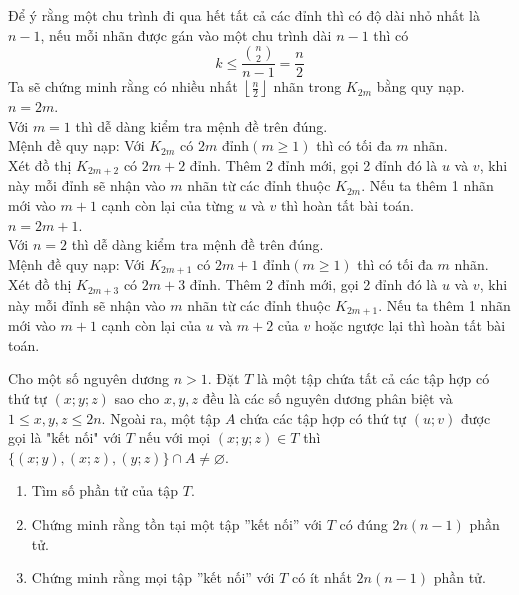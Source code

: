 \documentclass[11pt]{scrartcl}
\begin{document}
\begin{itemize}[label=, leftmargin=0em, itemsep=0.5em]
\begin{sol}
        Để ý rằng một chu trình  đi qua hết tất cả các đỉnh thì có độ dài nhỏ nhất là $n - 1$, nếu mỗi nhãn được gán vào một chu trình dài $n-1$ thì có 
        $$
        k \leq \frac{\displaystyle \binom{n}{2}}{n-1} = \frac{n}{2}
        $$
        Ta sẽ chứng minh rằng có nhiều nhất $\left\lfloor\frac{n}{2}\right\rfloor$ nhãn trong $K_{2m}$ bằng quy nạp.\\
         $n = 2m$.\\
        Với $m = 1$ thì dễ dàng kiểm tra mệnh đề trên đúng.\\
        Mệnh đề quy nạp: Với $K_{2m}$ có $2m$ đỉnh$(m \geq 1)$ thì có tối đa $m$ nhãn.\\
        Xét đồ thị $K_{2m+2}$ có $2m + 2$ đỉnh. Thêm 2 đỉnh mới, gọi 2 đỉnh đó là $u$ và $v$, khi này mỗi đỉnh sẽ nhận vào $m$ nhãn từ các đỉnh thuộc $K_{2m}$. Nếu ta thêm 1 nhãn mới vào $m + 1$ cạnh còn lại của từng $u$ và $v$ thì hoàn tất bài toán.\\
         $n = 2m + 1$.\\
        Với $n = 2$ thì dễ dàng kiểm tra mệnh đề trên đúng.\\
        Mệnh đề quy nạp: Với $K_{2m + 1}$ có $2m + 1$ đỉnh$(m \geq 1)$ thì có tối đa $m$ nhãn.\\
        Xét đồ thị $K_{2m+3}$ có $2m + 3$ đỉnh. Thêm 2 đỉnh mới, gọi 2 đỉnh đó là $u$ và $v$, khi này mỗi đỉnh sẽ nhận vào $m$ nhãn từ các đỉnh thuộc $K_{2m+1}$. Nếu ta thêm 1 nhãn mới vào $m + 1$ cạnh còn lại của $u$ và $m + 2$ của $v$ hoặc ngược lại thì hoàn tất bài toán.\\
    \end{sol}
    \begin{bt}
        Cho một số nguyên dương $n>1$. Đặt $T$ là một tập chứa tất cả các tập hợp có thứ tự $(x;y;z)$ sao cho $x,y,z$ đều là các số nguyên dương phân biệt và $1\leq x,y,z\leq 2n$. Ngoài ra, một tập $A$ chứa các tập hợp có thứ tự $(u;v)$ được gọi là "kết nối" với $T$ nếu với mọi $(x;y;z)\in T$ thì $\{(x;y),(x;z),(y;z)\} \cap A \neq \varnothing$.
        \begin{enumerate}[label=(\alph*)]
            \item Tìm số phần tử của tập $T$.
            \item Chứng minh rằng tồn tại một tập ''kết nối'' với $T$ có đúng $2n(n-1)$ phần tử.
            \item Chứng minh rằng mọi tập ''kết nối'' với $T$ có ít nhất $2n(n-1)$ phần tử.
        \end{enumerate}


\end{bt}
\end{itemize}
\end{document}
